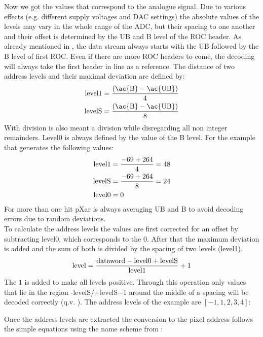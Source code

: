 Now we got the values that correspond to the analogue signal. Due to various effects (e.g. different supply voltages and \ac{DAC} settings) the absolute values of the levels may vary in the whole range of the \ac{ADC}, but their spacing to one another and their offset is determined by the \ac{UB} and \ac{B} level of the \ac{ROC} header. As already mentioned in , the data stream always starts with the \ac{UB} followed by the \ac{B} level of first \ac{ROC}. Even if there are more \ac{ROC} headers to come, the decoding will always take the first header in line as a reference. The distance of two address levels and their maximal deviation are defined by:
\begin{align}
	\z{level}1 &= \frac{\left( \z{\ac{B}} - \z{\ac{UB}} \right)}{4}\\
	\z{levelS} &= \frac{\left( \z{\ac{B}} - \z{\ac{UB}} \right)}{8}
\end{align}
With division is also meant a division while disregarding all non integer remainders. Level$0$ is always defined by the value of the \ac{B} level. For the example that generates the following values:
\begin{align*}
	\text{level}1 &= \frac{-69+264}{4} = 48\\
	\text{levelS} &= \frac{-69+264}{8} = 24\\
	\text{level}0 &= 0
\end{align*}
For more than one hit pXar is always averaging \ac{UB} and \ac{B} to avoid decoding errors due to random deviations.\\
To calculate the address levels the values are first corrected for an offset by subtracting level$0$, which corresponds to the $0$. After that the maximum deviation is added and the sum of both is divided by the spacing of two levels (level1).
\begin{equation}
	\text{level} = \frac{\text{dataword} - \text{level}0 + \text{levelS}}{\text{level}1} + 1
\end{equation}
The $1$ is added to make all levels positive. Through this operation only values that lie in the region -levelS/+levelS$-1$ around the middle of a spacing will be decoded correctly (q.v. ). The address levels of the example are $[-1, 1, 2, 3, 4]$:
\begin{center}
\terminal{[-264, -69, 29, -1, 1, 2, 3, 4, 43]}                                                    
\end{center}
Once the address levels are extracted the conversion to the pixel address follows the simple equations using the name scheme from :
